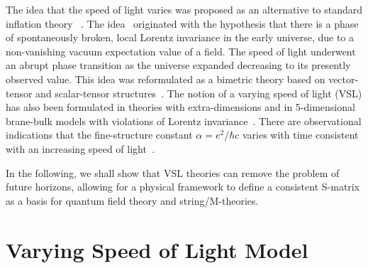 \documentclass[a4paper,12pt]{article}
\begin{document}
The idea that the speed of light varies was proposed as an alternative to
standard inflation theory
~\cite{Moffat,Moffat2,Albrecht,Barrow,Barrow2,Brandenberger,
Avelino,Hark,Magueijo,Clayton,Drummond,Liberati,Kiritsis}.
The idea~\cite{Moffat} originated with the hypothesis that there
is a phase of spontaneously broken, local Lorentz invariance in the early
universe, due to a non-vanishing vacuum expectation value of a field. The
speed of light underwent an abrupt phase transition as the universe
expanded decreasing to its presently observed value. This idea was
reformulated as a bimetric theory based on vector-tensor and scalar-tensor
structures~\cite{Clayton,Drummond,Liberati}. The notion of a varying speed
of light (VSL) has also been formulated in theories with extra-dimensions
and in 5-dimensional brane-bulk models with violations of Lorentz
invariance~\cite{Kiritsis}. There are observational indications that the
fine-structure constant $\alpha=e^2/\hbar c$ varies with time consistent
with an increasing speed of light~\cite{Webb}.

In the following, we shall show that VSL theories can remove the problem of
future horizons, allowing for a physical framework to define a consistent
S-matrix as a basis for quantum field theory and string/M-theories.

\section{\bf Varying Speed of Light Model}
\end{document}
